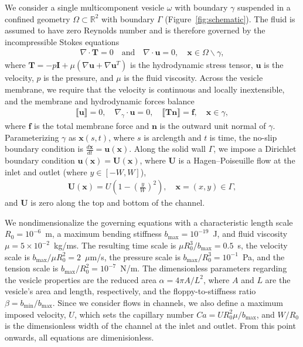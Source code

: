 \documentclass[twoside,twocolumn,9pt]{article}
\newcommand{\ff}{\mathbf{f}}
\newcommand{\nn}{\mathbf{n}}
\newcommand{\RR}{\mathbb{R}}
\newcommand{\uu}{\mathbf{u}}
\newcommand{\TT}{\mathbf{T}}
\newcommand{\UU}{\mathbf{U}}
\newcommand{\xx}{\mathbf{x}}
\begin{document}
We consider a single multicomponent vesicle $\omega$ with boundary
$\gamma$ suspended in a confined geometry $\Omega \subset \RR ^2$ with
boundary $\Gamma$ (Figure~\ref{fig:schematic}). The fluid is assumed to
have zero Reynolds number and is therefore governed by the
incompressible Stokes equations
\begin{align}
    \nabla \cdot \TT = 0 \quad \text{and} \quad \nabla \cdot \uu = 0, 
        \quad \xx \in \Omega \backslash \gamma,
\end{align}
where $\TT = -p\mathbf{I} + \mu\left(\nabla \uu + \nabla \uu^T \right)$
is the hydrodynamic stress tensor, $\uu$ is the velocity, $p$ is the
pressure, and $\mu$ is the fluid viscosity. Across the vesicle membrane,
we require that the velocity is continuous and locally inextensible, and
the membrane and hydrodynamic forces balance
\begin{align}
  \llbracket \uu \rrbracket = 0, \quad 
  \nabla_{\gamma} \cdot \uu = 0, \quad
  \llbracket \TT\nn \rrbracket = \ff, \quad \xx \in \gamma,
\end{align}
where $\ff$ is the total membrane force and $\nn$ is the outward unit
normal of $\gamma$. Parameterizing $\gamma$ as $\xx(s,t)$, where $s$ is
arclength and $t$ is time, the no-slip boundary condition is
$\frac{d\xx}{dt} = \uu(\xx)$. Along the solid wall $\Gamma$, we impose a
Dirichlet boundary condition $\uu(\xx) = \UU(\xx)$, where $\UU$ is a
Hagen–Poiseuille flow at the inlet and outlet (where $y\in[-W,W]$),
\begin{align}
  \UU(\xx) = U \left(1 - \left(\frac{y}{W}\right)^2 \right), 
    \quad \xx = (x,y) \in \Gamma,
\end{align}
and $\UU$ is zero along the top and bottom of the channel.

We nondimensionalize the governing equations with a characteristic
length scale $R_0 = 10^{-6}$~m, a maximum bending stiffness $b_{\max} =
10^{-19}$~J, and fluid viscosity $\mu = 5 \times 10^{-2}$~kg/ms. The
resulting time scale is $\mu R_0^3/b_{\max} = 0.5$~s, the velocity scale
is $b_{\max}/\mu R_0^2=2$~$\mu$m/s, the pressure scale is
$b_{\max}/R_0^3 = 10^{-1}$~Pa, and the tension scale is $b_{\max}/R_0^2
= 10^{-7}$~N/m. The dimensionless parameters regarding the vesicle
properties are the reduced area $\alpha = 4\pi A/L^2$, where $A$ and $L$
are the vesicle's area and length, respectively, and the
floppy-to-stiffness ratio $\beta = b_{\min}/b_{\max}$. Since we consider
flows in channels, we also define a maximum imposed velocity, $U$, which
sets the capillary number $Ca = U R_{0}^{2} \mu/b_{\max}$, and $W/R_0$
is the dimensionless width of the channel at the inlet and outlet. From
this point onwards, all equations are dimenisionless.
\end{document}
